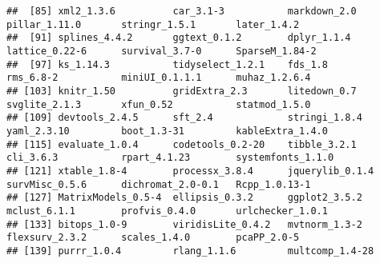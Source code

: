\documentclass[
]{article}
\begin{document}
\begin{verbatim}
##  [85] xml2_1.3.6          car_3.1-3           markdown_2.0        pillar_1.11.0       stringr_1.5.1       later_1.4.2        
##  [91] splines_4.4.2       ggtext_0.1.2        dplyr_1.1.4         lattice_0.22-6      survival_3.7-0      SparseM_1.84-2     
##  [97] ks_1.14.3           tidyselect_1.2.1    fds_1.8             rms_6.8-2           miniUI_0.1.1.1      muhaz_1.2.6.4      
## [103] knitr_1.50          gridExtra_2.3       litedown_0.7        svglite_2.1.3       xfun_0.52           statmod_1.5.0      
## [109] devtools_2.4.5      sft_2.4             stringi_1.8.4       yaml_2.3.10         boot_1.3-31         kableExtra_1.4.0   
## [115] evaluate_1.0.4      codetools_0.2-20    tibble_3.2.1        cli_3.6.3           rpart_4.1.23        systemfonts_1.1.0  
## [121] xtable_1.8-4        processx_3.8.4      jquerylib_0.1.4     survMisc_0.5.6      dichromat_2.0-0.1   Rcpp_1.0.13-1      
## [127] MatrixModels_0.5-4  ellipsis_0.3.2      ggplot2_3.5.2       mclust_6.1.1        profvis_0.4.0       urlchecker_1.0.1   
## [133] bitops_1.0-9        viridisLite_0.4.2   mvtnorm_1.3-2       flexsurv_2.3.2      scales_1.4.0        pcaPP_2.0-5        
## [139] purrr_1.0.4         rlang_1.1.6         multcomp_1.4-28
\end{verbatim}
\end{document}
